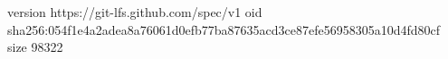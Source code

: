 version https://git-lfs.github.com/spec/v1
oid sha256:054f1e4a2adea8a76061d0efb77ba87635acd3ce87efe56958305a10d4fd80cf
size 98322
